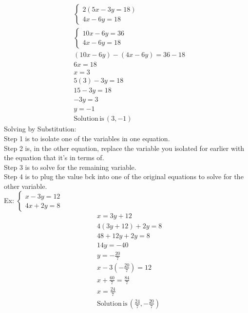 \documentclass[11pt, fleqn]{article}
\begin{document}
\begin{align*}
    &\left\{\begin{matrix}
    2(5x-3y=18)\\
    4x-6y=18
    \end{matrix}\right.\\
    &\left\{\begin{matrix}
    10x-6y=36\\
    4x-6y=18
    \end{matrix}\right.\\
    &(10x-6y)-(4x-6y)=36-18\\
    &6x=18\\
    &x=3\\
    &5(3)-3y=18\\
    &15-3y=18\\
    &-3y=3\\
    &y=-1\\
    &\mathrm{Solution}\,\mathrm{is}\,(3,-1)
\end{align*}
Solving by Substitution:\\
Step 1 is to isolate one of the variables in one equation.\\
Step 2 is, in the other equation, replace the variable you isolated for earlier with the equation that it's in terms of.\\
Step 3 is to solve for the remaining variable.\\
Step 4 is to plug the value bck into one of the original equations to solve for the other variable.\\
Ex: $\left\{\begin{matrix} x-3y=12\\
4x+2y=8 \end{matrix}\right.$
\begin{align*}
    & x=3y+12\\
    &4(3y+12)+2y=8\\
    &48+12y+2y=8\\
    &14y=-40\\
    &y=-\frac{20}{7}\\
    &x-3\left(-\frac{20}{7}\right)=12\\
    &x+\frac{60}{7}=\frac{84}{7}\\
    &x=\frac{24}{7}\\
    &\mathrm{Solution}\,\mathrm{is}\,\left(\frac{24}{7},-\frac{20}{7}\right)
\end{align*}
\end{document}

